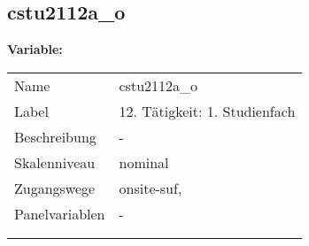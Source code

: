 	
	
	\subsection{cstu2112a\_o}
	\label{subSection:cstu2112a_o}

	\noindent\textbf{Variable:}\\
		\begin{tabular}{lL{11.3cm}}
			\label{tableVariable:cstu2112a_o}
			Name & cstu2112a\_o \\
			Label & 12. Tätigkeit: 1. Studienfach \\
			Beschreibung & - \\
			Skalenniveau & nominal \\
			Zugangswege &
				onsite-suf,
 \\
			Panelvariablen & -
			 \\
			 \\
 \\
		\end{tabular}







